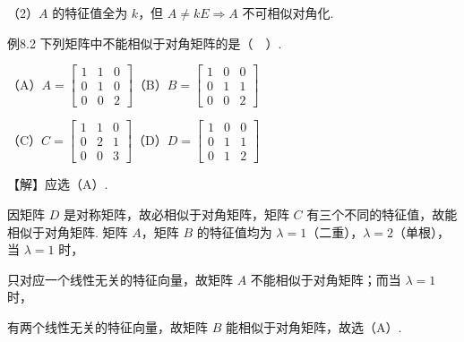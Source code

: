 
（2）$A$ 的特征值全为 $k$，但 $A\ne kE\Rightarrow A$ 不可相似对角化.

\begin{fcard}{例8.2}
下列矩阵中不能相似于对角矩阵的是（$\quad$）.

（A）$A=\begin{bmatrix}1&1&0\\0&1&0\\0&0&2\end{bmatrix}$\qquad（B）$B=\begin{bmatrix}1&0&0\\0&1&1\\0&0&2\end{bmatrix}$

（C）$C=\begin{bmatrix}1&1&0\\0&2&1\\0&0&3\end{bmatrix}$\qquad（D）$D=\begin{bmatrix}1&0&0\\0&1&1\\0&1&2\end{bmatrix}$

【解】应选（A）.

因矩阵 $D$ 是对称矩阵，故必相似于对角矩阵，矩阵 $C$ 有三个不同的特征值，故能相似于对角矩阵. 矩阵 $A$，矩阵 $B$ 的特征值均为 $\lambda=1$（二重），$\lambda=2$（单根），当 $\lambda=1$ 时，


只对应一个线性无关的特征向量，故矩阵 $A$ 不能相似于对角矩阵；而当 $\lambda=1$ 时，


有两个线性无关的特征向量，故矩阵 $B$ 能相似于对角矩阵，故选（A）.
\end{fcard}

